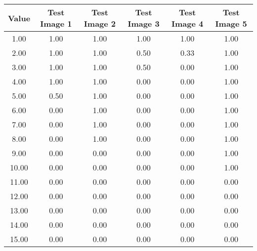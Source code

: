 \begin{tabular}{|c|c|c|c|c|c|}
\hline
\textbf{Value}&\textbf{Test Image 1}&\textbf{Test Image 2}&\textbf{Test Image 3}&\textbf{Test Image 4}&\textbf{Test Image 5}\\\hline
1.00&1.00&1.00&1.00&1.00&1.00\\\hline
2.00&1.00&1.00&0.50&0.33&1.00\\\hline
3.00&1.00&1.00&0.50&0.00&1.00\\\hline
4.00&1.00&1.00&0.00&0.00&1.00\\\hline
5.00&0.50&1.00&0.00&0.00&1.00\\\hline
6.00&0.00&1.00&0.00&0.00&1.00\\\hline
7.00&0.00&1.00&0.00&0.00&1.00\\\hline
8.00&0.00&1.00&0.00&0.00&1.00\\\hline
9.00&0.00&0.00&0.00&0.00&1.00\\\hline
10.00&0.00&0.00&0.00&0.00&1.00\\\hline
11.00&0.00&0.00&0.00&0.00&0.00\\\hline
12.00&0.00&0.00&0.00&0.00&0.00\\\hline
13.00&0.00&0.00&0.00&0.00&0.00\\\hline
14.00&0.00&0.00&0.00&0.00&0.00\\\hline
15.00&0.00&0.00&0.00&0.00&0.00\\\hline
\end{tabular}

